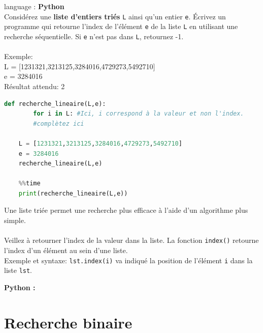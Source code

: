 \begin{Exercice}[5 minutes] language : \textbf{Python}\\

    Considérez une \textbf{liste d’entiers triés} \lstinline{L} ainsi qu’un entier \lstinline{e}. Écrivez un programme qui retourne l'index de l'élément \lstinline{e} de la liste \lstinline{L} en utilisant une recherche séquentielle. Si \lstinline{e} n’est pas dans \lstinline{L}, retournez -1.\\\\
    
    Exemple:\\
    L = [1231321,3213125,3284016,4729273,5492710]\\
    e = 3284016\\
    Résultat attendu: 2\\
  
\begin{lstlisting}[language=Python]
    def recherche_lineaire(L,e):
        for i in L: #Ici, i correspond à la valeur et non l'index.
        #complètez ici 
        
    L = [1231321,3213125,3284016,4729273,5492710]
    e = 3284016
    recherche_lineaire(L,e)
    
    %%time
    print(recherche_lineaire(L,e))
\end{lstlisting}

    \begin{conseil}
        Une liste triée permet une recherche plus efficace à l'aide d'un algorithme plus simple.\\\\
        Veillez à retourner l'index de la valeur dans la liste. La fonction \lstinline{index()} retourne l'index d'un élément au sein d'une liste.\\Exemple et syntaxe: \lstinline{lst.index(i)} va indiqué la position de l'élément \lstinline{i} dans la liste \lstinline{lst}.
    \end{conseil}


    \begin{solution}
        \textbf{Python :}
        
    \end{solution}
\end{Exercice}

\newpage
\section{Recherche binaire}

